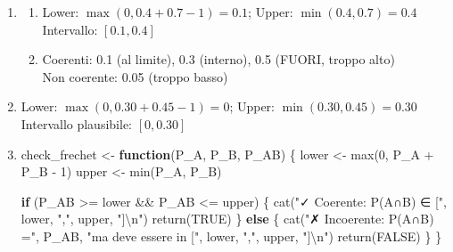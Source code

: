 \documentclass[
  letterpaper,
  DIV=11,
  numbers=noendperiod,
  oneside]{scrreprt}
\newenvironment{Shaded}{\begin{snugshade}}{\end{snugshade}}
\newcommand{\ConstantTok}[1]{\textcolor[rgb]{0.56,0.35,0.01}{#1}}
\newcommand{\ControlFlowTok}[1]{\textcolor[rgb]{0.00,0.23,0.31}{\textbf{#1}}}
\newcommand{\DecValTok}[1]{\textcolor[rgb]{0.68,0.00,0.00}{#1}}
\newcommand{\FunctionTok}[1]{\textcolor[rgb]{0.28,0.35,0.67}{#1}}
\newcommand{\NormalTok}[1]{\textcolor[rgb]{0.00,0.23,0.31}{#1}}
\newcommand{\OtherTok}[1]{\textcolor[rgb]{0.00,0.23,0.31}{#1}}
\newcommand{\SpecialCharTok}[1]{\textcolor[rgb]{0.37,0.37,0.37}{#1}}
\newcommand{\StringTok}[1]{\textcolor[rgb]{0.13,0.47,0.30}{#1}}
\theoremstyle{definition}
\theoremstyle{plain}
\theoremstyle{definition}
\theoremstyle{remark}
\begin{document}
\begin{tcolorbox}
\begin{enumerate}
\def\labelenumi{\arabic{enumi}.}
\setcounter{enumi}{3}
\item
  \begin{enumerate}
  \def\labelenumii{\alph{enumii}.}
  \item
    Lower: \(\max(0, 0.4 + 0.7 - 1) = 0.1\); Upper:
    \(\min(0.4, 0.7) = 0.4\)\\
    Intervallo: \([0.1, 0.4]\)
  \item
    Coerenti: 0.1 (al limite), 0.3 (interno), 0.5 (FUORI, troppo alto)\\
    Non coerente: 0.05 (troppo basso)
  \end{enumerate}
\item
  Lower: \(\max(0, 0.30 + 0.45 - 1) = 0\); Upper:
  \(\min(0.30, 0.45) = 0.30\)\\
  Intervallo plausibile: \([0, 0.30]\)
\item
\begin{Shaded}
\begin{Highlighting}[]
\NormalTok{check\_frechet }\OtherTok{\textless{}{-}} \ControlFlowTok{function}\NormalTok{(P\_A, P\_B, P\_AB) \{}
\NormalTok{  lower }\OtherTok{\textless{}{-}} \FunctionTok{max}\NormalTok{(}\DecValTok{0}\NormalTok{, P\_A }\SpecialCharTok{+}\NormalTok{ P\_B }\SpecialCharTok{{-}} \DecValTok{1}\NormalTok{)}
\NormalTok{  upper }\OtherTok{\textless{}{-}} \FunctionTok{min}\NormalTok{(P\_A, P\_B)}

  \ControlFlowTok{if}\NormalTok{ (P\_AB }\SpecialCharTok{\textgreater{}=}\NormalTok{ lower }\SpecialCharTok{\&\&}\NormalTok{ P\_AB }\SpecialCharTok{\textless{}=}\NormalTok{ upper) \{}
    \FunctionTok{cat}\NormalTok{(}\StringTok{"✓ Coerente: P(A∩B) ∈ ["}\NormalTok{, lower, }\StringTok{","}\NormalTok{, upper, }\StringTok{"]}\SpecialCharTok{\textbackslash{}n}\StringTok{"}\NormalTok{)}
    \FunctionTok{return}\NormalTok{(}\ConstantTok{TRUE}\NormalTok{)}
\NormalTok{  \} }\ControlFlowTok{else}\NormalTok{ \{}
    \FunctionTok{cat}\NormalTok{(}\StringTok{"✗ Incoerente: P(A∩B) ="}\NormalTok{, P\_AB, }
        \StringTok{"ma deve essere in ["}\NormalTok{, lower, }\StringTok{","}\NormalTok{, upper, }\StringTok{"]}\SpecialCharTok{\textbackslash{}n}\StringTok{"}\NormalTok{)}
    \FunctionTok{return}\NormalTok{(}\ConstantTok{FALSE}\NormalTok{)}
\NormalTok{  \}}
\NormalTok{\}}
\end{Highlighting}
\end{Shaded}
\end{enumerate}


\end{tcolorbox}
\end{document}

